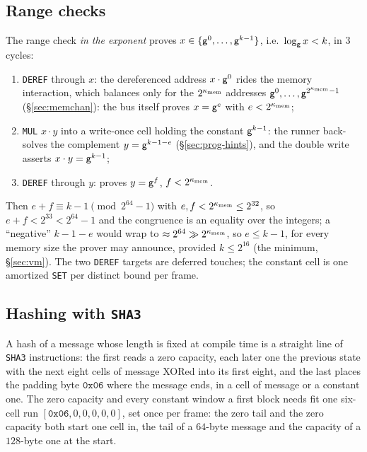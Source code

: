 \subsection{Range checks}\label{sec:prog-range-checks}

The range check \emph{in the exponent} proves $x\in\{\mathsf{g}^{0},\dots,\mathsf{g}^{k-1}\}$, i.e.\ $\log_{\mathsf{g}}x<k$, in 3 cycles:
\begin{enumerate}
\item \texttt{DEREF} through $x$: the dereferenced address $x\cdot\mathsf{g}^{0}$ rides the memory interaction, which balances only for the $2^{\kappa_{\mathrm{mem}}}$ addresses $\mathsf{g}^{0},\dots,\mathsf{g}^{2^{\kappa_{\mathrm{mem}}}-1}$ (\S\ref{sec:memchan}): the bus itself proves $x=\mathsf{g}^{e}$ with $e<2^{\kappa_{\mathrm{mem}}}$;
\item \texttt{MUL} $x\cdot y$ into a write-once cell holding the constant $\mathsf{g}^{k-1}$: the runner back-solves the complement $y=\mathsf{g}^{k-1-e}$ (\S\ref{sec:prog-hints}), and the double write asserts $x\cdot y=\mathsf{g}^{k-1}$;
\item \texttt{DEREF} through $y$: proves $y=\mathsf{g}^{f}$, $f<2^{\kappa_{\mathrm{mem}}}$.
\end{enumerate}
Then $e+f\equiv k-1\pmod{2^{64}-1}$ with $e,f<2^{\kappa_{\mathrm{mem}}}\le2^{32}$, so $e+f<2^{33}<2^{64}-1$ and the congruence is an equality over the integers; a ``negative'' $k-1-e$ would wrap to $\approx2^{64}\gg2^{\kappa_{\mathrm{mem}}}$, so $e\le k-1$, for every memory size the prover may announce, provided $k\le2^{16}$ (the minimum, \S\ref{sec:vm}). The two \texttt{DEREF} targets are deferred touches; the constant cell is one amortized \texttt{SET} per distinct bound per frame.

\subsection{Hashing with \texttt{SHA3}}\label{sec:prog-hashing}

A hash of a message whose length is fixed at compile time is a straight line of \texttt{SHA3} instructions: the first reads a zero capacity, each later one the previous state with the next eight cells of message XORed into its first eight, and the last places the padding byte $\mathtt{0x06}$ where the message ends, in a cell of message or a constant one. The zero capacity and every constant window a first block needs fit one six-cell run $[\mathtt{0x06},0,0,0,0,0]$, set once per frame: the zero tail and the zero capacity both start one cell in, the tail of a $64$-byte message and the capacity of a $128$-byte one at the start.

